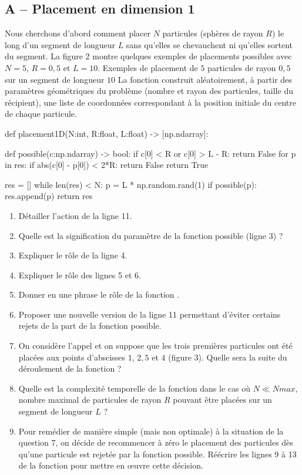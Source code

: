 \documentclass[twoside,french,11pt]{VcCours}
\begin{document}
\subsection*{A -- Placement en dimension 1}
Nous cherchons d'abord comment placer $N$ particules (sphères de rayon $R$) le long d'un segment de longueur $L$
sans qu'elles se chevauchent ni qu'elles sortent du segment. La figure 2 montre quelques exemples de placements
possibles avec $N = 5$, $R = 0,5$ et $L = 10$.
Exemples de placement de $5$ particules de rayon $0,5$ sur un segment de longueur $10$
La fonction  construit aléatoirement, à partir des paramètres géométriques du problème (nombre
et rayon des particules, taille du récipient), une liste de coordonnées correspondant à la position initiale du
centre de chaque particule.
\begin{Python}
def placement1D(N:int, R:float, L:float) -> [np.ndarray]:

    def possible(c:np.ndarray) -> bool:
        if c[0] < R or c[0] > L - R: return False
        for p in res:
            if abs(c[0] - p[0]) < 2*R: return False
        return True

    res = []
    while len(res) < N:
        p = L * np.random.rand(1)
        if possible(p): res.append(p)
    return res
\end{Python}
\renewcommand{\labelenumi}{\textbf{Q \theenumi.}}
\begin{enumerate}
\item
Détailler l'action de la ligne 11.
\item
Quelle est la signification du paramètre  de la fonction possible (ligne 3) ?
\item
Expliquer le rôle de la ligne 4.
\item
Expliquer le rôle des lignes 5 et 6.
\item
Donner en une phrase le rôle de la fonction .
\item
Proposer une nouvelle version de la ligne 11 permettant d'éviter certains rejets de la part de la fonction
possible.
\item
On considère l'appel  et on suppose que les trois premières particules ont
été placées aux points d'abscisses $1$, $2,5$ et $4$ (figure 3). 
Quelle sera la suite du déroulement de la fonction  ?
\item
Quelle est la complexité temporelle de la fonction  dans le cas où $N\ll Nmax$, nombre
maximal de particules de rayon $R$ pouvant être placées sur un segment de longueur $L$ ?
\item
Pour remédier de manière simple (mais non optimale) à la situation de la question 7, on décide
de recommencer à zéro le placement des particules dès qu'une particule est rejetée par la fonction possible.
Réécrire les lignes 9 à 13 de la fonction  pour mettre en œuvre cette décision.
\end{enumerate}
\end{document}

